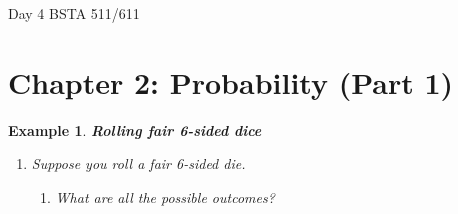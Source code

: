 \documentclass[12pt]{amsart}
\newtheorem{example}[theorem]{Example}
\begin{document}
\setcounter{section}{2}
Day 4 BSTA 511/611
{\huge  
\section*{Chapter 2: Probability (Part 1)}
}



{\large 


%
%
%
%
%
%
%
%
%
%
%
%
%


\begin{example}  \textbf{Rolling fair 6-sided dice} \newline

\begin{enumerate} 

\item Suppose you roll a fair 6-sided die. 

\begin{enumerate} 
\item What are all the possible outcomes?

\vspace{1.5cm}



\end{enumerate}
\end{enumerate}
\end{example}}
\end{document}
